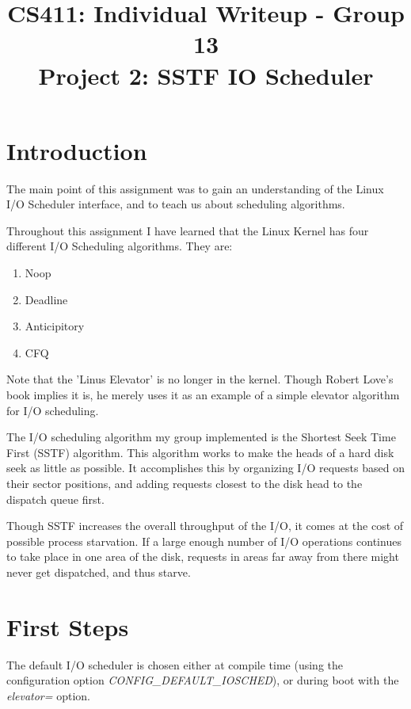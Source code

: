 \documentclass[letterpaper,10pt,titlepage]{article}
\title{CS411: Individual Writeup - Group 13\\
    Project 2: SSTF IO Scheduler}
\author{\name}
\begin{document}
\maketitle

\section*{Introduction}

The main point of this assignment was to gain an understanding of the
Linux I/O Scheduler interface, and to teach us about scheduling
algorithms.

Throughout this assignment I have learned that the Linux Kernel 
has four different I/O Scheduling algorithms. They are:
\begin{enumerate}
    \item Noop
    \item Deadline
    \item Anticipitory
    \item CFQ
\end{enumerate}

Note that the 'Linus Elevator' is no longer in the kernel. Though Robert Love's
book implies it is, he merely uses it as an example of a simple elevator
algorithm for I/O scheduling.

The I/O scheduling algorithm my group implemented is the Shortest Seek
Time First (SSTF) algorithm. This algorithm works to make the heads of a
hard disk seek as little as possible. It accomplishes this by organizing
I/O requests based on their sector positions, and adding requests
closest to the disk head to the dispatch queue first.

Though SSTF increases the overall throughput of the I/O, it comes at the
cost of possible process starvation. If a large enough number of I/O
operations continues to take place in one area of the disk, requests in
areas far away from there might never get dispatched, and thus starve.

\section*{First Steps}

The default I/O scheduler is chosen either at compile time (using the
configuration option \emph{CONFIG\_DEFAULT\_IOSCHED}), or during boot with the
\emph{elevator=} option.
\end{document}

